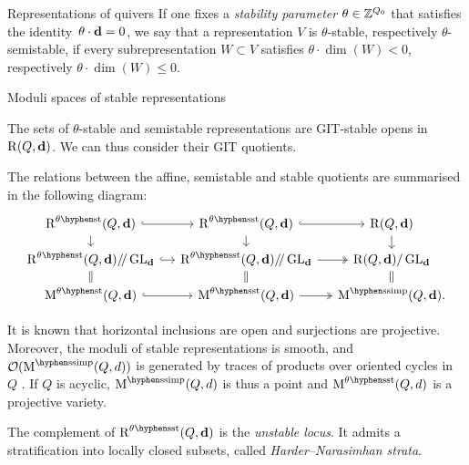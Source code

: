 \documentclass[final,20pt]{beamer}
\newlength{\colwidth}
\begin{document}
\begin{frame}[t]
\begin{columns}[t]
\begin{column}{\colwidth}
\begin{block}{Representations of quivers}
    If one fixes a \emph{stability parameter} $\theta \in \mathbb{Z}^{Q_0}$ that satisfies
    the identity~$\theta\cdot\mathbf{d}=0$, we say that a representation $V$
    is $\theta$-stable, respectively $\theta$-semistable,
    if every subrepresentation $W \subset V$ satisfies
    $\theta \cdot \dim(W) < 0$, respectively
    $\theta\cdot\dim(W)\leq 0$.

  \end{block}

  \begin{block}{Moduli spaces of stable representations}

    The sets of $\theta$-stable and semistable representations
    are GIT-stable opens in $\operatorname{R}(Q, \mathbf{d})$.
    We can thus consider their GIT quotients.

    The relations between the affine, semistable and stable quotients are summarised in the following diagram:
    \begin{equation}
      \begin{tikzcd}[row sep=small, column sep=small, ampersand replacement=\&]
        \repspace^{\theta\stable}(Q, \tuple{d}) \arrow[r,hook] \arrow[d]     \& \repspace^{\theta\semistable}(Q, \tuple{d}) \arrow[r,hook] \arrow[d]     \& \repspace(Q, \tuple{d}) \arrow[d] \\
        \repspace^{\theta\stable}(Q, \tuple{d})\gitquot\GLd \arrow[r, hook] \arrow[d, equal] \& \repspace^{\theta\semistable}(Q, \tuple{d})\gitquot\GLd \arrow[r, two heads] \arrow[d, equal] \& \repspace(Q, \tuple{d}) / \GLd \arrow[d, equal] \\
        \modulispace^{\theta\stable}(Q, \tuple{d}) \arrow[r, hook]          \& \modulispace^{\theta\semistable}(Q, \tuple{d}) \arrow[r, two heads]                \& \modulispace^{\semisimple}(Q, \tuple{d}).
      \end{tikzcd}
    \end{equation}

    It is known that horizontal inclusions are open and surjections are projective.
    Moreover, the moduli of stable representations is smooth, and
    $\mathcal{O}(\modulispace^{\semisimple}(Q, d))$ is generated by traces of products over
    oriented cycles in $Q$ \cite{MR958897}.
    If $Q$ is acyclic, $\modulispace^{\semisimple}(Q, d)$ is thus a point
    and $\modulispace^{\theta\semistable}(Q, d)$ is a projective variety.

    The complement of $\repspace^{\theta\semistable}(Q,\tuple{d})$ is the
    \emph{unstable locus}. It admits a stratification into locally closed
    subsets, called \emph{Harder--Narasimhan strata}.
  \end{block}


\end{column}
\end{columns}
\end{frame}
\end{document}
